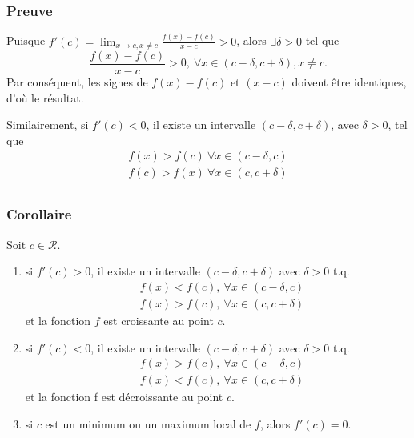 \documentclass[usepdftitle=false]{beamer}
\def\cR{\mathcal{R}}
\begin{document}
\begin{frame}
\frametitle{Preuve}

Puisque $f'(c) = \lim_{x \rightarrow c, x \ne c} \frac{f(x)-f(c)}{x-c} > 0$, alors $\exists \delta > 0$ tel que
$$
\frac{f(x)-f(c)}{x-c} > 0,\ \forall x \in (c-\delta, c+\delta), x \ne c.
$$
Par conséquent, les signes de $f(x)-f(c)$ et $(x-c)$ doivent être identiques, d'où le résultat. 
\begin{flushright}
\qedsymbol
\end{flushright}

\mbox{}

Similairement, si $f'(c) < 0$, il existe un intervalle $(c-\delta, c+\delta)$, avec $\delta > 0$, tel que
\begin{align*}
f(x) > f(c) \ \forall x \in (c-\delta, c)\\
f(c) > f(x) \ \forall x \in (c, c+\delta)\\
\end{align*}

\end{frame}

\begin{frame}
\frametitle{Corollaire}

Soit $c \in \cR$.
\begin{enumerate}
\item 
si $f'(c) > 0$, il existe un intervalle $(c - \delta, c + \delta)$ avec $\delta > 0$ t.q.
\begin{align*}
& f(x) < f(c), \ \forall x \in (c - \delta, c) \\
& f(x) > f(c), \ \forall x \in (c, c + \delta)
\end{align*}
et la fonction $f$ est croissante au point $c$.
\item
si $f'(c) < 0$, il existe un intervalle $(c - \delta, c + \delta)$ avec $\delta > 0$ t.q.
\begin{align*}
& f(x) > f(c), \ \forall x \in (c - \delta, c) \\
& f(x) < f(c), \ \forall x \in (c, c + \delta)
\end{align*}
et la fonction f est décroissante au point $c$.
\item
si $c$ est un minimum ou un maximum local de $f$, alors $f'(c) = 0$.
\end{enumerate}

\end{frame}
\end{document}
